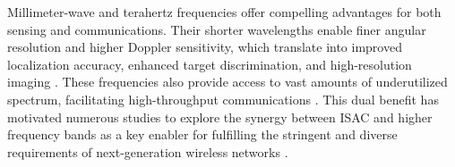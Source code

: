 \documentclass[10pt,journal,compsoc]{IEEEtran}
\theoremstyle{myremark}
\theoremstyle{myexample}
\begin{document}


Millimeter-wave and terahertz frequencies offer compelling advantages for both sensing and communications. Their shorter wavelengths enable finer angular resolution and higher Doppler sensitivity, which translate into improved localization accuracy, enhanced target discrimination, and high-resolution imaging \cite{yao2014:terahertz-active-imaging-radar-preprocessing-experiment-results}. These frequencies also provide access to vast amounts of underutilized spectrum, facilitating high-throughput communications \cite{askar2024:mobilizing-terahertz-beam-d-band-analog-beamforming-front-end-prototyping-long-range-6g-trials}. This dual benefit has motivated numerous studies to explore the synergy between \gls{ISAC} and higher frequency bands as a key enabler for fulfilling the stringent and diverse requirements of next-generation wireless networks \cite{mao2022:waveform-design-joint-sensing-communications-millimeter-wave-low-terahertz-bands, zhuo2024:multi-beam-integrated-sensing-communication-state-of-the-art-challenges-opportunities, abanto2024:hierarchical-functionality-prioritization-multicast-isac-optimal-admission-control-discrete-phase-beamforming}.
\end{document}
